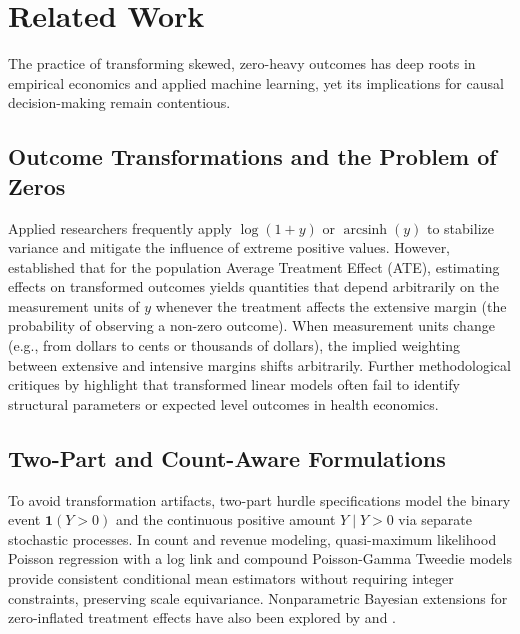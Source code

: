 \documentclass[11pt,a4paper]{article}
\begin{document}
\section{Related Work}
\label{sec:related_work}

The practice of transforming skewed, zero-heavy outcomes has deep roots in empirical economics and applied machine learning, yet its implications for causal decision-making remain contentious.

\subsection{Outcome Transformations and the Problem of Zeros}
Applied researchers frequently apply $\log(1+y)$ or $\operatorname{arcsinh}(y)$ to stabilize variance and mitigate the influence of extreme positive values. However, \cite{chen2024logszeros} established that for the population Average Treatment Effect (ATE), estimating effects on transformed outcomes yields quantities that depend arbitrarily on the measurement units of $y$ whenever the treatment affects the extensive margin (the probability of observing a non-zero outcome). When measurement units change (e.g., from dollars to cents or thousands of dollars), the implied weighting between extensive and intensive margins shifts arbitrarily. Further methodological critiques by \cite{mullahy2024whytransform} highlight that transformed linear models often fail to identify structural parameters or expected level outcomes in health economics.

\subsection{Two-Part and Count-Aware Formulations}
To avoid transformation artifacts, two-part hurdle specifications \citep{mullahy2024whytransform} model the binary event $\mathbf{1}(Y>0)$ and the continuous positive amount $Y \mid Y>0$ via separate stochastic processes. In count and revenue modeling, quasi-maximum likelihood Poisson regression with a log link \citep{chen2024logszeros} and compound Poisson-Gamma Tweedie models provide consistent conditional mean estimators without requiring integer constraints, preserving scale equivariance. Nonparametric Bayesian extensions for zero-inflated treatment effects have also been explored by \cite{oganisian2021zeroinflated} and \cite{kim2024zeroinflatedcate}.
\end{document}
